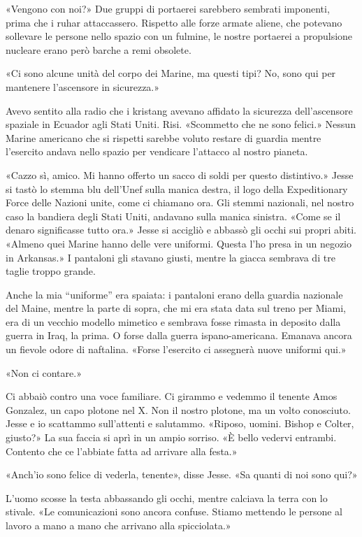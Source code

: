 «Vengono con noi?» Due gruppi di portaerei sarebbero sembrati imponenti,
prima che i ruhar attaccassero. Rispetto alle forze armate aliene, che
potevano sollevare le persone nello spazio con un fulmine, le nostre
portaerei a propulsione nucleare erano però barche a remi obsolete.

«Ci sono alcune unità del corpo dei Marine, ma questi tipi? No, sono qui
per mantenere l'ascensore in sicurezza.»

Avevo sentito alla radio che i kristang avevano affidato la sicurezza
dell'ascensore spaziale in Ecuador agli Stati Uniti. Risi. «Scommetto
che ne sono felici.» Nessun Marine americano che si rispetti sarebbe
voluto restare di guardia mentre l'esercito andava nello spazio per
vendicare l'attacco al nostro pianeta.

«Cazzo sì, amico. Mi hanno offerto un sacco di soldi per questo
distintivo.» Jesse si tastò lo stemma blu dell'Unef sulla manica destra,
il logo della Expeditionary Force delle Nazioni unite, come ci chiamano
ora. Gli stemmi nazionali, nel nostro caso la bandiera degli Stati
Uniti, andavano sulla manica sinistra. «Come se il denaro significasse
tutto ora.» Jesse si accigliò e abbassò gli occhi sui propri abiti.
«Almeno quei Marine hanno delle vere uniformi. Questa l'ho presa in un
negozio in Arkansas.» I pantaloni gli stavano giusti, mentre la giacca
sembrava di tre taglie troppo grande.

Anche la mia ``uniforme'' era spaiata: i pantaloni erano della guardia
nazionale del Maine, mentre la parte di sopra, che mi era stata data sul
treno per Miami, era di un vecchio modello mimetico e sembrava fosse
rimasta in deposito dalla guerra in Iraq, la prima. O forse dalla guerra
ispano-americana. Emanava ancora un fievole odore di naftalina. «Forse
l'esercito ci assegnerà nuove uniformi qui.»

«Non ci contare.»

Ci abbaiò contro una voce familiare. Ci girammo e vedemmo il tenente
Amos Gonzalez, un capo plotone nel X. Non il nostro plotone, ma un volto
conosciuto. Jesse e io scattammo sull'attenti e salutammo. «Riposo,
uomini. Bishop e Colter, giusto?» La sua faccia si aprì in un ampio
sorriso. «È bello vedervi entrambi. Contento che ce l'abbiate fatta ad
arrivare alla festa.»

«Anch'io sono felice di vederla, tenente», disse Jesse. «Sa quanti di
noi sono qui?»

L'uomo scosse la testa abbassando gli occhi, mentre calciava la terra
con lo stivale. «Le comunicazioni sono ancora confuse. Stiamo mettendo
le persone al lavoro a mano a mano che arrivano alla spicciolata.»

